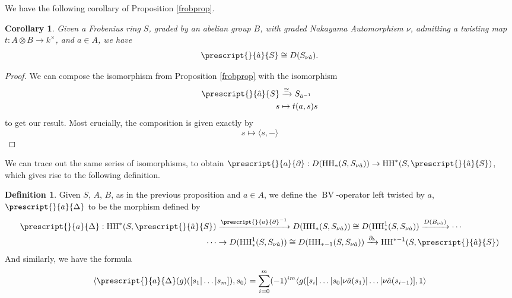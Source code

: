 \documentclass{article}
\newcommand{\HH}{\operatorname{HH}}
\newcommand{\bv}{\operatorname{BV}}
\theoremstyle{plain}
\newtheorem{corollary}[theorem]{Corollary}
\theoremstyle{definition}
\newtheorem{defn}[theorem]{Definition}
\begin{document}
We have the following corollary of Proposition \ref{frobprop}.
\begin{corollary} Given a Frobenius ring $S$, graded by an abelian group $B$, with graded Nakayama Automorphism $\nu$, admitting a twisting map $t: A \otimes B \rightarrow k^\times$, and $a \in A$, we have
$$\prescript{}{\hat{a}}{S} \cong D(S_{\nu \hat{a}}).$$
\end{corollary}
\begin{proof} We can compose the isomorphism from Proposition \ref{frobprop} with the isomorphism
$$\begin{aligned} \prescript{}{\hat{a}}{S} &\xrightarrow{\cong} S_{\hat{a}^{-1}} \\
 s &\mapsto t(a,s) s \end{aligned}$$
to get our result. Most crucially, the composition is given exactly by
$$s \mapsto \langle s, - \rangle$$
\end{proof}
We can trace out the same series of isomorphisms, to obtain $\prescript{}{a}{\partial}: D(\HH_*(S, S_{\nu \hat{a}})) \rightarrow \HH^*(S,\prescript{}{\hat{a}}{S}) $, which gives rise to the following definition.

\begin{defn} Given $S$, $A$, $B$, as in the previous proposition and $a \in A $, we define the $\bv$-operator left twisted by $a$, $\prescript{}{a}{\Delta}$ to be the morphism defined by
$$\begin{aligned}\prescript{}{a}{\Delta}: \HH^*(S,\prescript{}{\hat{a}}{S}) &\xrightarrow{\prescript{}{a}{\partial}^{-1}} D(\HH_*(S, S_{\nu \hat{a}}))  \cong D(\HH_*^1(S, S_{\nu \hat{a}}))  \xrightarrow{D(B_{\nu\hat{a}})} \cdots \\
\cdots &\rightarrow D(\HH_*^1(S, S_{\nu \hat{a}}))  \cong D(\HH_{*-1}(S, S_{\nu \hat{a}}))  \xrightarrow{\partial_b}  \HH^{*-1}(S,\prescript{}{\hat{a}}{S})\end{aligned}$$
And similarly, we have the formula
$$\langle \prescript{}{a}{\Delta}(g)([s_1 | \ldots | s_m]), s_0 \rangle = \sum_{i=0}^m (-1)^{im}\langle g([s_i | \ldots | s_0 | \nu\hat{a}(s_1) | \ldots | \nu\hat{a}(s_{i-1})], 1 \rangle$$
\end{defn}
\end{document}

